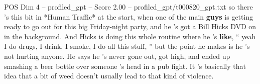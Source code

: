 \begin{textsample}{POS Dim 4 – profiled\_gpt – Score 2.00 – profiled\_gpt/t000820\_gpt.txt}  \label{ex:f4_pos_037}
so there 's this bit in *Human Traffic* at the start, when one of the main \textbf{guys} is getting ready to go out for this big Friday-night party, and he ’s got a Bill Hicks DVD on in the background.
And Hicks is doing this whole routine where he ’s \textbf{like}, “ yeah I do drugs, I drink, I smoke, I do all this stuff, ” but the point he makes is he ’s not hurting anyone.
He says he ’s never gone out, got high, and ended up smashing a beer bottle over someone ’s head in a pub fight.
It ’s basically that idea that a bit of weed doesn't usually lead to that kind of violence.

\end{textsample}
